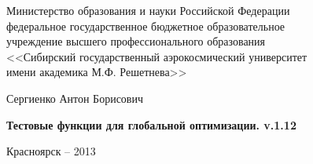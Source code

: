 \thispagestyle{empty}

\begin{center}
Министерство образования и науки Российской Федерации \\ федеральное государственное бюджетное образовательное \\ учреждение высшего профессионального образования \\<<Сибирский государственный аэрокосмический университет \\ имени академика М.Ф. Решетнева>>
\end{center}

\vspace{20mm}


\vspace{30mm}
\begin{center}
{\large Сергиенко Антон Борисович}
\end{center}

\vspace{5mm}
\begin{center}
{\bf \large Тестовые функции для глобальной оптимизации. v.1.12
\par}

\vspace{10mm}


\vspace{10mm}

\end{center}

\vspace{80mm}


\vspace{20mm}
\begin{center}
{Красноярск -- 2013}
\end{center}

\newpage